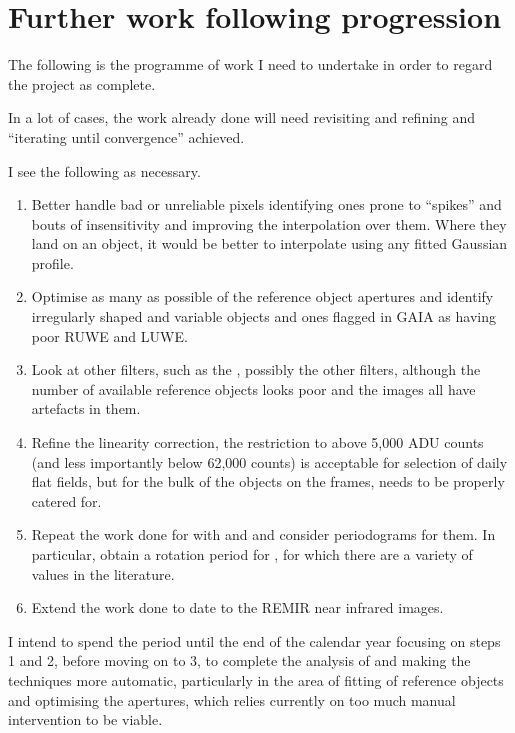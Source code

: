 \section{Further work following progression}
\protect\label{section:worktocome}

The following is the programme of work I need to undertake in order to regard
the project as complete.

In a lot of cases, the work already done will need revisiting and refining and
``iterating until convergence'' achieved.

I see the following as necessary.

\begin{enumerate}
  \item Better handle bad or unreliable pixels identifying ones prone to
  ``spikes'' and bouts of insensitivity and improving the interpolation over
  them. Where they land on an object, it would be better to interpolate using
  any fitted Gaussian profile.
  \item Optimise as many as possible of the reference object apertures and
  identify irregularly shaped and variable objects and ones flagged in GAIA as
  having poor RUWE and LUWE.
  \item Look at other filters, such as the \gfilter, possibly the other filters,
  although the number of available reference objects looks poor and the
  {\zfilter} images all have artefacts in them.
  \item Refine the linearity correction, the restriction to above 5,000 ADU
  counts (and less importantly below 62,000 counts) is acceptable for selection
  of daily flat fields, but for the bulk of the objects on the frames, needs
  to be properly catered for.
  \item Repeat the work done for {\ross} with {\prox} and {\bstar} and consider
  periodograms for them. In particular, obtain a rotation period for \bstar,
  for which there are a variety of values in the literature.
  \item Extend the work done to date to the REMIR near infrared images.
\end{enumerate}

I intend to spend the period until the end of the calendar year focusing on
steps 1 and 2, before moving on to 3, to complete the analysis of {\ross} and
making the techniques more automatic, particularly in the area of
fitting of reference objects and optimising the apertures, which relies
currently on too much manual intervention to be viable.

